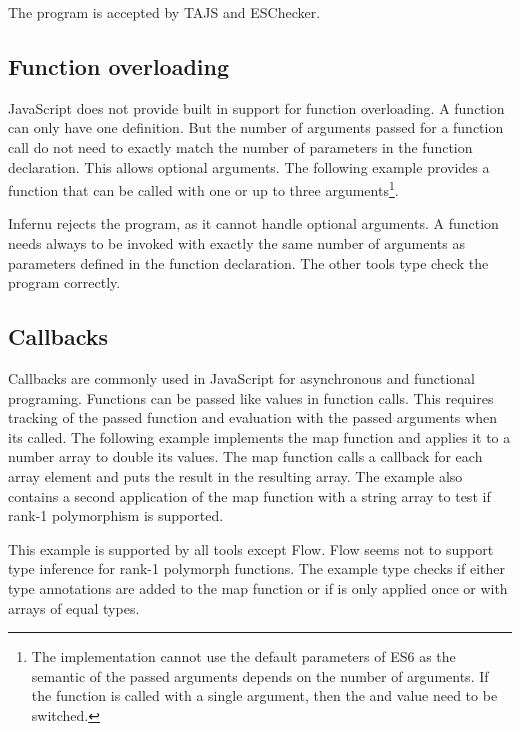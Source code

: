 The program is accepted by TAJS and ESChecker.


\subsection{Function overloading}
JavaScript does not provide built in support for function overloading. A function can only have one definition. But the number of arguments passed for a function call do not need to exactly match the number of parameters in the function declaration. This allows optional arguments. The following example provides a  function that can be called with one or up to three arguments\footnote{The implementation cannot use the default parameters of ES6 as the semantic of the passed arguments depends on the number of arguments. If the function is called with a single argument, then the  and  value need to be switched.}. 


Infernu rejects the program, as it cannot handle optional arguments. A function needs always to be invoked with exactly the same number of arguments as parameters defined in the function declaration. The other tools type check the program correctly.

\subsection{Callbacks}
Callbacks are commonly used in JavaScript for asynchronous and functional programing. Functions can be passed like values in function calls. This requires tracking of the passed function and evaluation with the passed arguments when its called. The following example implements the map function and applies it to a number array to double its values. The map function calls a callback for each array element and puts the result in the resulting array. The example also contains a second application of the map function with a string array to test if rank-1 polymorphism is supported. %


This example is supported by all tools except Flow. Flow seems not to support type inference for rank-1 polymorph functions. The example type checks if either type annotations are added to the map function or if  is only applied once or with arrays of equal types. 

